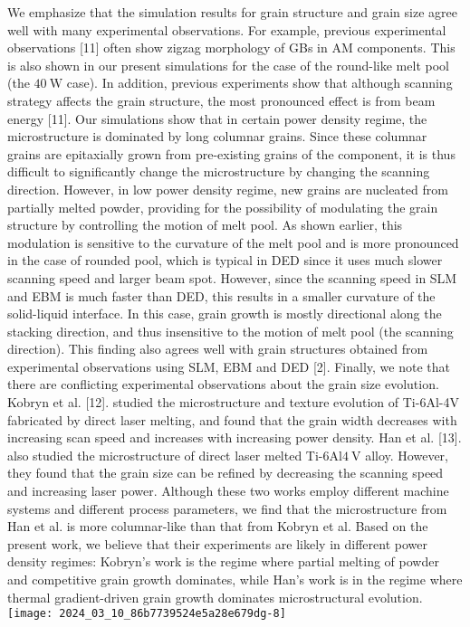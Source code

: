 \documentclass[10pt]{article}
\begin{document}
We emphasize that the simulation results for grain structure and grain size agree well with many experimental observations. For example, previous experimental observations [11] often show zigzag morphology of GBs in AM components. This is also shown in our present simulations for the case of the round-like melt pool (the $40 \mathrm{~W}$ case). In addition, previous experiments show that although scanning strategy affects the grain structure, the most pronounced effect is from beam energy [11]. Our simulations show that in certain power density regime, the microstructure is dominated by long columnar grains. Since these columnar grains are epitaxially grown from pre-existing grains of the component, it is thus difficult to significantly change the microstructure by changing the scanning direction. However, in low power density regime, new grains are nucleated from partially melted powder, providing for the possibility of modulating the grain structure by controlling the motion of melt pool. As shown earlier, this modulation is sensitive to the curvature of the melt pool and is more pronounced in the case of rounded pool, which is typical in DED since it uses much slower scanning speed and larger beam spot. However, since the scanning speed in SLM and EBM is much faster than DED, this results in a smaller curvature of the solid-liquid interface. In this case, grain growth is mostly directional along the stacking direction, and thus insensitive to the motion of melt pool (the scanning direction). This finding also agrees well with grain structures obtained from experimental observations using SLM, EBM and DED [2]. Finally, we note that there are conflicting experimental observations about the grain size evolution. Kobryn et al. [12]. studied the microstructure and texture evolution of Ti-6Al-4V fabricated by direct laser melting, and found that the grain width decreases with increasing scan speed and increases with increasing power density. Han et al. [13]. also studied the microstructure of direct laser melted Ti-6Al$4 \mathrm{~V}$ alloy. However, they found that the grain size can be refined by decreasing the scanning speed and increasing laser power. Although these two works employ different machine systems and different process parameters, we find that the microstructure from Han et al. is more columnar-like than that from Kobryn et al. Based on the present work, we believe that their experiments are likely in different power density regimes: Kobryn's work is the regime where partial melting of powder and competitive grain growth dominates, while Han's work is in the regime where thermal gradient-driven grain growth dominates microstructural evolution.\\
\texttt{[image: 2024\_03\_10\_86b7739524e5a28e679dg-8]}
\end{document}
